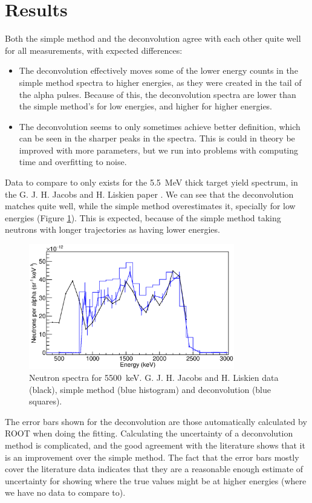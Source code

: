 \documentclass[a4paper,12pt]{report}
\begin{document}
\section{Results}
Both the simple method and the deconvolution agree with each other quite well for all measurements, with expected differences:
\begin{itemize}
	\item The deconvolution effectively moves some of the lower energy counts in the simple method spectra to higher energies, as they were created in the tail of the alpha pulses.
		Because of this, the deconvolution spectra are lower than the simple method's for low energies, and higher for higher energies.
	\item The deconvolution seems to only sometimes achieve better definition, which can be seen in the sharper peaks in the spectra.
		This is could in theory be improved with more parameters, but we run into problems with computing time and overfitting to noise.
\end{itemize}

Data to compare to only exists for the \qty{5.5}{\MeV} thick target yield spectrum, in the G. J. H. Jacobs and H. Liskien paper \cite{jacobs}.
We can see that the deconvolution matches quite well, while the simple method overestimates it, specially for low energies (Figure \ref{pulsed_5mev}).
This is expected, because of the simple method taking neutrons with longer trajectories as having lower energies.

\begin{figure}[H]
	\centering
	\includegraphics[width=0.80\textwidth]{pulsed_5mev.eps}
	\caption{Neutron spectra for \qty{5500}{\keV}.
	G. J. H. Jacobs and H. Liskien data (black), simple method (blue histogram) and deconvolution (blue squares).}
	\label{pulsed_5mev}
\end{figure}

The error bars shown for the deconvolution are those automatically calculated by ROOT when doing the fitting.
Calculating the uncertainty of a deconvolution method is complicated, and the good agreement with the literature shows that it is an improvement over the simple method.
The fact that the error bars mostly cover the literature data indicates that they are a reasonable enough estimate of uncertainty for showing where the true values might be at higher energies (where we have no data to compare to).
\\
\end{document}
